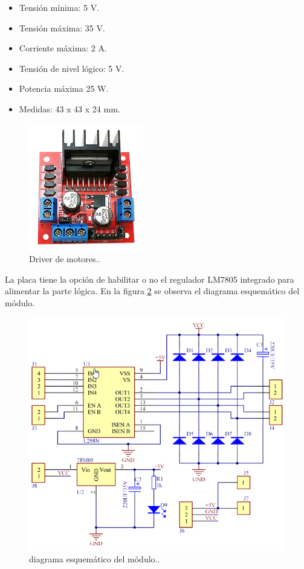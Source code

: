 \begin{itemize}
	\item Tensión mínima: 5 V.
	\item Tensión máxima: 35 V.
	\item Corriente máxima: 2 A.
	\item Tensión de nivel lógico: 5 V.
	\item Potencia máxima 25 W.
	\item Medidas: 43 x 43 x 24 mm.
\end{itemize}
\pagebreak

\begin{figure}[h]
	\centering
	\includegraphics[width=5cm]{./Figures/L298N.png}
	\caption{Driver de motores.\protect\footnotemark.}
	\label{fig:Driver}
\end{figure}


La placa tiene la opción de habilitar o no el regulador LM7805 integrado para alimentar la parte lógica. En la figura \ref{fig:Esquema} se observa el diagrama esquemático del módulo.


\begin{figure}[h]
	\centering
	\includegraphics[width=12cm]{./Figures/Modulo.png}
	\caption{diagrama esquemático del módulo.\protect\footnotemark.}
	\label{fig:Esquema}
\end{figure}




